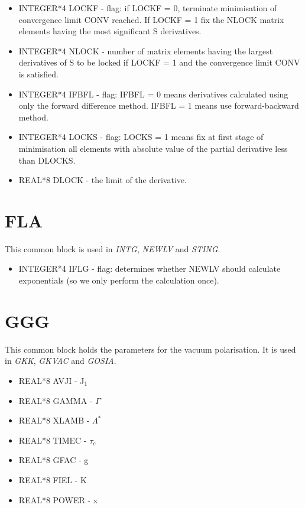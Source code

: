 \begin{itemize}
\item INTEGER*4 LOCKF - flag: if LOCKF = 0, terminate minimisation of convergence limit
CONV reached. If LOCKF = 1 fix the NLOCK matrix elements having the most
significant S derivatives.
\item INTEGER*4 NLOCK - number of matrix elements having the largest
derivatives of S to be locked if LOCKF = 1 and the convergence limit CONV is
satisfied.
\item INTEGER*4 IFBFL - flag: IFBFL = 0 means derivatives calculated using
only the forward difference method. IFBFL = 1 means use forward-backward
method.
\item INTEGER*4 LOCKS - flag: LOCKS = 1 means fix at first stage of
minimisation all elements with absolute value of the partial derivative less
than DLOCKS.
\item REAL*8 DLOCK - the limit of the derivative.
\end{itemize}

\section{FLA}

This common block is used in {\em INTG}, {\em NEWLV} and {\em STING}.

\begin{itemize}
\item INTEGER*4 IFLG - flag: determines whether {NEWLV} should calculate
exponentials (so we only perform the calculation once).
\end{itemize}

\section{GGG}

This common block holds the parameters for the vacuum polarisation. It is
used in {\em GKK}, {\em GKVAC} and {\em GOSIA}.

\begin{itemize}
\item REAL*8 AVJI - J$_1$
\item REAL*8 GAMMA - $\Gamma$
\item REAL*8 XLAMB - $\Lambda^*$
\item REAL*8 TIMEC - $\tau_c$
\item REAL*8 GFAC - g
\item REAL*8 FIEL - K
\item REAL*8 POWER - x
\end{itemize}

